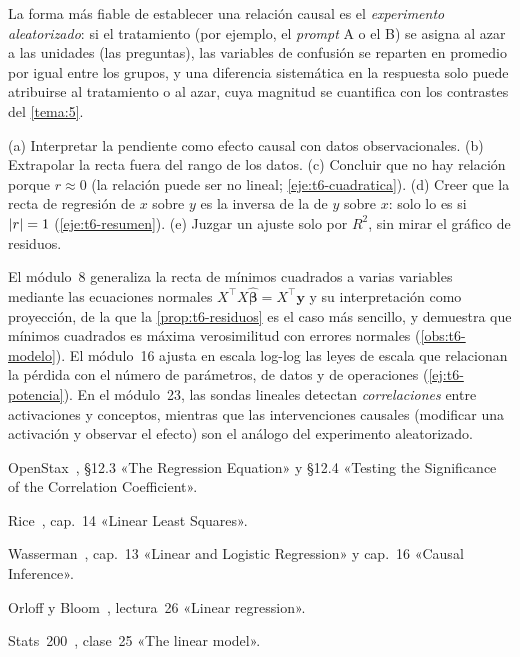 La forma más fiable de establecer una relación causal es el \emph{experimento aleatorizado}: si el tratamiento (por ejemplo, el \emph{prompt} A o el B) se asigna al azar a las unidades (las preguntas), las variables de confusión se reparten en promedio por igual entre los grupos, y una diferencia sistemática en la respuesta solo puede atribuirse al tratamiento o al azar, cuya magnitud se cuantifica con los contrastes del \cref{tema:5}.

\begin{observacion}\label{obs:t6-errores}
(a) Interpretar la pendiente como efecto causal con datos observacionales.
(b) Extrapolar la recta fuera del rango de los datos.
(c) Concluir que no hay relación porque $r\approx0$ (la relación puede ser no lineal; \cref{eje:t6-cuadratica}).
(d) Creer que la recta de regresión de $x$ sobre $y$ es la inversa de la de $y$ sobre $x$: solo lo es si $\lvert r\rvert=1$ (\cref{eje:t6-resumen}).
(e) Juzgar un ajuste solo por $R^{2}$, sin mirar el gráfico de residuos.
\end{observacion}

\begin{observacion}
El módulo~8 generaliza la recta de mínimos cuadrados a varias variables mediante las ecuaciones normales $X^{\top}X\widehat{\bm\beta}=X^{\top}\mathbf y$ y su interpretación como proyección, de la que la \cref{prop:t6-residuos} es el caso más sencillo, y demuestra que mínimos cuadrados es máxima verosimilitud con errores normales (\cref{obs:t6-modelo}). El módulo~16 ajusta en escala log-log las leyes de escala que relacionan la pérdida con el número de parámetros, de datos y de operaciones (\cref{ej:t6-potencia}). En el módulo~23, las sondas lineales detectan \emph{correlaciones} entre activaciones y conceptos, mientras que las intervenciones causales (modificar una activación y observar el efecto) son el análogo del experimento aleatorizado.
\end{observacion}

\begin{lecturas}
\item OpenStax~\cite{openstax}, §12.3 «The Regression Equation» y §12.4 «Testing the Significance of the Correlation Coefficient».
\item Rice~\cite{rice}, cap.~14 «Linear Least Squares».
\item Wasserman~\cite{wasserman}, cap.~13 «Linear and Logistic Regression» y cap.~16 «Causal Inference».
\item Orloff y Bloom~\cite{mit1805}, lectura~26 «Linear regression».
\item Stats~200~\cite{stats200}, clase~25 «The linear model».
\end{lecturas}

